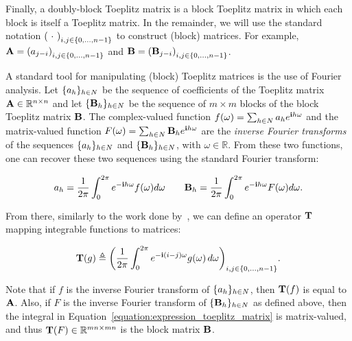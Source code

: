 {Finally, a doubly-block Toeplitz matrix is a block Toeplitz matrix in which each block is itself a Toeplitz matrix.
In the remainder, we will use the standard notation $\leftmat\ \cdot\ \rightmat_{i,j \in \{0,\ldots,n-1\}}$ to construct (block) matrices.
For example, $\Amat = \leftmat a_{j-i} \rightmat_{i,j \in \{0,\ldots,n-1\}}$ and $\Bmat = \leftmat \Bmat_{j-i} \rightmat_{i,j \in \{0,\ldots,n-1\}}$.

A standard tool for manipulating (block) Toeplitz matrices is the use of Fourier analysis.
Let $\{a_h\}_{h \in N}$ be the sequence of coefficients of the Toeplitz matrix $\mathbf{A} \in \mathbb{R}^{n\times n}$ and let $\{\mathbf{B}_h\}_{h \in N}$ be the sequence of $m\times m$ blocks of the block Toeplitz matrix $\mathbf{B}$.
The complex-valued function $f(\omega) = \sum_{h \in N} a_h e^{\mathbf{i} h \omega}$ and the matrix-valued function $F(\omega) = \sum_{h \in N} \mathbf{B}_h e^{\mathbf{i} h \omega}$ are the \emph{inverse Fourier transforms} of the sequences $\{a_h\}_{h \in N}$ and $\{\mathbf{B}_h\}_{h \in N}$, with $\omega \in \mathbb{R}$.
From these two functions, one can recover these two sequences using the standard Fourier transform:

\begin{equation}
  a_h = \frac{1}{2\pi} \int_0^{2\pi} e^{-\mathbf{i} h \omega} f(\omega) d\omega \quad \quad \mathbf{B}_h = \frac{1}{2\pi} \int_0^{2\pi} e^{-\mathbf{i} h \omega} F(\omega) d\omega .
\end{equation}

From there, similarly to the work done by~\citet{gray2006toeplitz,gutierrez2012block}, we can define an operator $\mathbf{T}$ mapping integrable functions to matrices:

\begin{equation}
  \Tmat(g)  \triangleq\leftmat\frac{1}{2\pi}\int_{0}^{2\pi}e^{-\ci(i-j)\omega}g(\omega)\,d\omega\rightmat_{i,j\in\{0,\ldots,n-1\}} . \label{equation:expression_toeplitz_matrix}
\end{equation}

Note that if $f$ is the inverse Fourier transform of $\{a_h\}_{h \in N}$, then $\mathbf{T}(f)$ is equal to $\mathbf{A}$.
Also, if $F$ is the inverse Fourier transform of $\{\mathbf{B}_h\}_{h \in N}$ as defined above, then the integral in Equation~\ref{equation:expression_toeplitz_matrix} is matrix-valued, and thus $\mathbf{T}(F) \in \mathbb{R}^{mn \times mn}$ is the block matrix $\mathbf{B}$.



}
